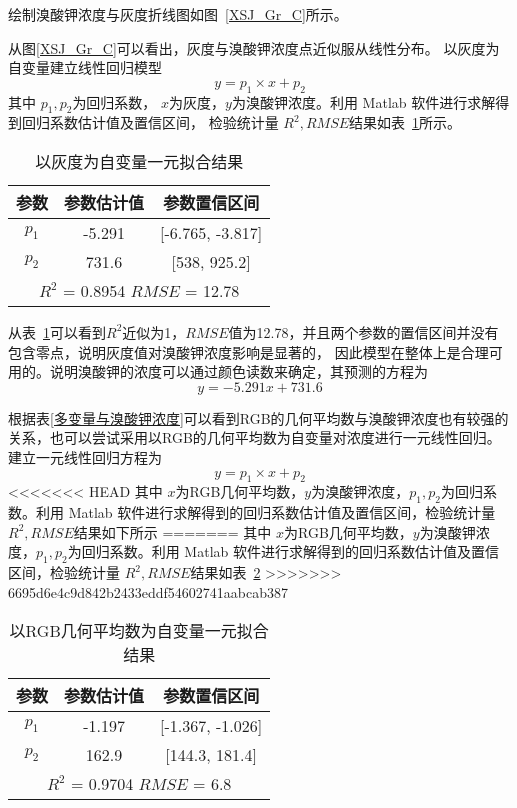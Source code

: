     绘制溴酸钾浓度与灰度折线图如图~\ref{XSJ_Gr_C}所示。


    从图\ref{XSJ_Gr_C}可以看出，灰度与溴酸钾浓度点近似服从线性分布。 以灰度为自变量建立线性回归模型
    $$ y = p_1 \times x + p_2$$
    其中 $p_{1},p_{2}$为回归系数， $x$为灰度，$y$为溴酸钾浓度。利用 Matlab 软件进行求解得到回归系数估计值及置信区间，
    检验统计量 $R^2, RMSE $结果如表~\ref{溴酸钾一元拟合}所示。

    \begin{table}[H]
        \centering
        \caption{以灰度为自变量一元拟合结果}
        \label{溴酸钾一元拟合}
        \begin{tabular}{@{}ccc@{}}
        \toprule
        参数        & 参数估计值      & 参数置信区间                   \\ \midrule
        $p_1$     & -5.291     & {[}-6.765, -3.817{]}     \\
        $p_2$     & 731.6      & {[}538, 925.2{]}         \\
        \hline
        \multicolumn{3}{c}{$R^2$ = 0.8954 $RMSE$ = 12.78} \\ \bottomrule
        \end{tabular}
        \end{table}
    从表~\ref{溴酸钾一元拟合}可以看到$R^2$近似为1，$RMSE$值为12.78，并且两个参数的置信区间并没有包含零点，说明灰度值对溴酸钾浓度影响是显著的，
    因此模型在整体上是合理可用的。说明溴酸钾的浓度可以通过颜色读数来确定，其预测的方程为
    $$ y = -5.291 x + 731.6 $$ 

    根据表\ref{多变量与溴酸钾浓度}可以看到RGB的几何平均数与溴酸钾浓度也有较强的关系，也可以尝试采用以RGB的几何平均数为自变量对浓度进行一元线性回归。
    建立一元线性回归方程为
     $$ y = p_1 \times x + p_2$$
<<<<<<< HEAD
    其中 $x$为RGB几何平均数，$y$为溴酸钾浓度，$p_1, p_2$为回归系数。利用 Matlab 软件进行求解得到的回归系数估计值及置信区间，检验统计量 $R^2, RMSE $结果如下所示
=======
    其中 $x$为RGB几何平均数，$y$为溴酸钾浓度，$p_1, p_2$为回归系数。利用 Matlab 软件进行求解得到的回归系数估计值及置信区间，检验统计量 $R^2, RMSE $结果如表~\ref{RGB拟合}
>>>>>>> 6695d6e4c9d842b2433eddf54602741aabcab387

    \begin{table}[H]
        \centering
        \caption{以RGB几何平均数为自变量一元拟合结果}
        \label{RGB拟合}
        \begin{tabular}{@{}ccc@{}}
        \toprule
        参数        & 参数估计值     & 参数置信区间                  \\ \midrule
        $p_1$     & -1.197    & {[}-1.367, -1.026{]}    \\
        $p_2$     & 162.9     & {[}144.3, 181.4{]}      \\
        \hline
        \multicolumn{3}{c}{$R^2$ = 0.9704 $RMSE$ = 6.8} \\ \bottomrule
        \end{tabular}
        \end{table}

